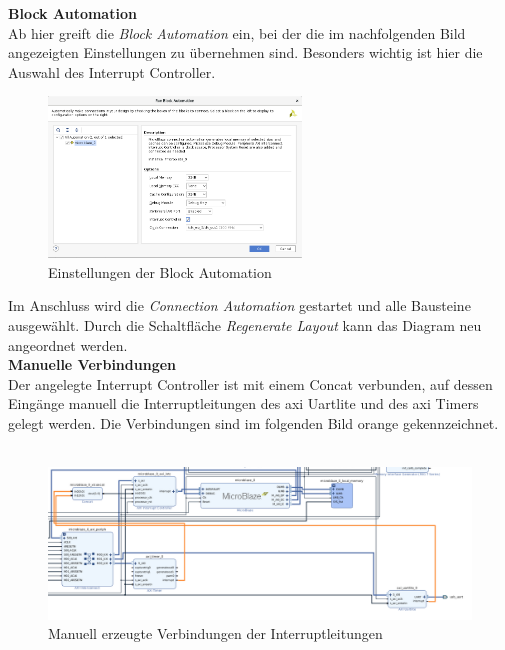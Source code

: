 \textbf{Block Automation}\\

Ab hier greift die \emph{Block Automation} ein, bei der die im nachfolgenden Bild angezeigten Einstellungen zu übernehmen sind.
Besonders wichtig ist hier die Auswahl des Interrupt Controller.

\begin{figure}[H]
\centering
\includegraphics[width=0.6\textwidth]{Hauptteil/schritt7.png}
\caption{Einstellungen der Block Automation}\label{fig:mbschritt7}
\end{figure}


Im Anschluss wird die \emph{Connection Automation} gestartet und alle Bausteine ausgewählt.
Durch die Schaltfläche \emph{Regenerate Layout} kann das Diagram neu angeordnet werden.\\

\textbf{Manuelle Verbindungen}\\

Der angelegte Interrupt Controller ist mit einem Concat verbunden, auf dessen Eingänge manuell die Interruptleitungen des \ac{axi} Uartlite und des \ac{axi} Timers gelegt werden.
Die Verbindungen sind im folgenden Bild orange gekennzeichnet.\\\\

\begin{figure}[H]
\centering
\includegraphics[width=1\textwidth]{Hauptteil/Schritt8.png}
\caption{Manuell erzeugte Verbindungen der Interruptleitungen}\label{fig:mbschritt8}
\end{figure}

